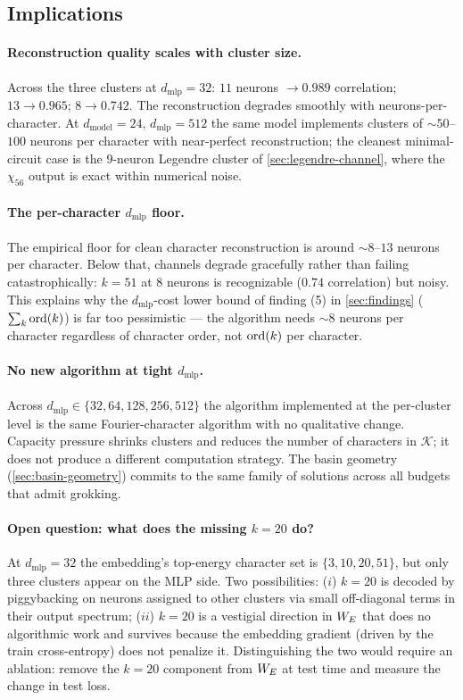 \subsection{Implications}
\label{subsec:cluster-implications}

\paragraph{Reconstruction quality scales with cluster size.}  Across
the three clusters at $d_{\text{mlp}} = 32$:
$11$ neurons $\to 0.989$ correlation;
$13 \to 0.965$;
$8 \to 0.742$.
The reconstruction degrades smoothly with neurons-per-character.  At
$d_{\text{model}} = 24$, $d_{\text{mlp}} = 512$ the same model
implements clusters of $\sim 50$--$100$ neurons per character with
near-perfect reconstruction; the cleanest minimal-circuit case is the
$9$-neuron Legendre cluster of \cref{sec:legendre-channel}, where the
$\chi_{56}$ output is exact within numerical noise.

\paragraph{The per-character $d_{\text{mlp}}$ floor.}  The empirical
floor for clean character reconstruction is around $\sim 8$--$13$
neurons per character.  Below that, channels degrade gracefully rather
than failing catastrophically: $k = 51$ at $8$ neurons is recognizable
($0.74$ correlation) but noisy.  This explains why the
$d_{\text{mlp}}$-cost lower bound of finding (5) in \cref{sec:findings}
($\sum_k \operatorname{ord}(k)$) is far too pessimistic --- the algorithm needs
$\sim 8$ neurons per character regardless of character order, not
$\operatorname{ord}(k)$ per character.

\paragraph{No new algorithm at tight $d_{\text{mlp}}$.}  Across
$d_{\text{mlp}} \in \{32, 64, 128, 256, 512\}$ the algorithm
implemented at the per-cluster level is the same Fourier-character
algorithm with no qualitative change.  Capacity pressure shrinks
clusters and reduces the number of characters in $\mathcal{K}$; it
does not produce a different computation strategy.  The basin geometry
(\cref{sec:basin-geometry}) commits to the same family of solutions
across all budgets that admit grokking.

\paragraph{Open question: what does the missing $k = 20$ do?}  At
$d_{\text{mlp}} = 32$ the embedding's top-energy character set is
$\{3, 10, 20, 51\}$, but only three clusters appear on the MLP side.
Two possibilities: ($i$) $k = 20$ is decoded by piggybacking on
neurons assigned to other clusters via small off-diagonal terms in
their output spectrum; ($ii$) $k = 20$ is a vestigial direction in
$W_E$ that does no algorithmic work and survives because the embedding
gradient (driven by the train cross-entropy) does not penalize it.
Distinguishing the two would require an ablation: remove the
$k = 20$ component from $W_E$ at test time and measure the change in
test loss.

